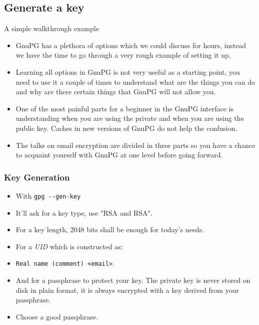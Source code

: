 \documentclass[hyperref={colorlinks=true}]{beamer}
\begin{document}
\subsection{Generate a key}
\begin{frame}{A simple walkthrough example}
  \begin{itemize}
    \item GnuPG has a plethora of options which we could discuss for hours,
instead we have the time to go through a very rough example of setting it up.
    \item Learning all options in GnuPG is not very useful as a starting point,
you need to use it a couple of times to understand what are the things you can
do and why are there certain things that GnuPG will not allow you.
    \item One of the most painful parts for a beginner in the GnuPG interface
is understanding when you are using the private and when you are using the
public key.  Caches in new versions of GnuPG do not help the confusion.
    \item The talks on email encryption are divided in three parts so you have
a chance to acquaint yourself with GnuPG at one level before going forward.
  \end{itemize}
\end{frame}

\begin{frame}[fragile]\frametitle{Key Generation}
  \begin{itemize}
    \item With \verb|gpg --gen-key|
    \item It'll ask for a key type, use "RSA and RSA".
    \item For a key length, 2048 bits shall be enough for today's needs.
    \item For a \emph{UID} which is constructed as:
    \item[] \texttt{Real name (comment) <email>}.
    \item And for a passphrase to protect your key.  The private key is never
stored on disk in plain format, it is always encrypted with a key derived from
your passphrase.
    \item Choose a good passphrase.
  \end{itemize}
\end{frame}
\end{document}
